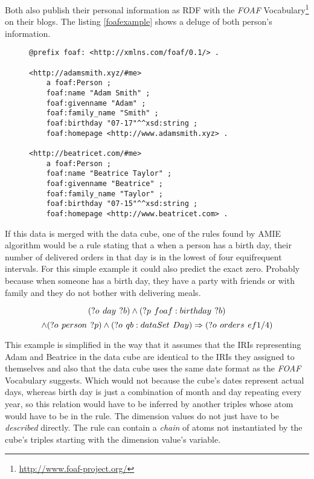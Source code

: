 Both also publish their personal information as RDF with the \textit{FOAF} Vocabulary\footnote{\href{http://www.foaf-project.org/}{http://www.foaf-project.org/}} on their blogs. The listing \ref{foafexample} shows a deluge of both person's information.

\begin{figure}[h]
\begin{lstlisting}[language = turtle, caption={RDF data published on Adam's and Beatrice's personal blogs}, label={foafexample},captionpos=b escapeinside={(*@}{@*)}]
@prefix foaf: <http://xmlns.com/foaf/0.1/> .

<http://adamsmith.xyz/#me>
    a foaf:Person ;
    foaf:name "Adam Smith" ;
    foaf:givenname "Adam" ;
    foaf:family_name "Smith" ;
    foaf:birthday "07-17"^^xsd:string ;
    foaf:homepage <http://www.adamsmith.xyz> .
      
<http://beatricet.com/#me>
    a foaf:Person ;
    foaf:name "Beatrice Taylor" ;
    foaf:givenname "Beatrice" ;
    foaf:family_name "Taylor" ;
    foaf:birthday "07-15"^^xsd:string ;
    foaf:homepage <http://www.beatricet.com> .
\end{lstlisting}
\end{figure}

If this data is merged with the data cube, one of the rules found by AMIE algorithm would be a rule stating that a when a person has a birth day, their number of delivered orders in that day is in the lowest of four equifrequent intervals. For this simple example it could also predict the exact zero. Probably because when someone has a birth day, they have a party with friends or with family and they do not bother with delivering meals.

$$
(?o\hspace{0.4em}day\hspace{0.4em}?b) \land (?p\hspace{0.4em}foaf:birthday\hspace{0.4em}?b)
$$
$$ 
\land (?o\hspace{0.4em}person\hspace{0.4em}?p) \land (?o\hspace{0.4em}qb:dataSet\hspace{0.4em}Day)  \Rightarrow (?o\hspace{0.4em}orders\hspace{0.4em}ef1/4) 
$$

This example is simplified in the way that it assumes that the IRIs representing Adam and Beatrice in the data cube are identical to the IRIs they assigned to themselves and also that the data cube uses the same date format as the \textit{FOAF} Vocabulary suggests. Which would not because the cube's dates represent actual days, whereas birth day is just a combination of month and day repeating every year, so this relation would have to be inferred by another triples whose atom would have to be in the rule. The dimension values do not just have to be \textit{described} directly. The rule can contain a \textit{chain} of atoms not instantiated by the cube's triples starting with the dimension value's variable.

